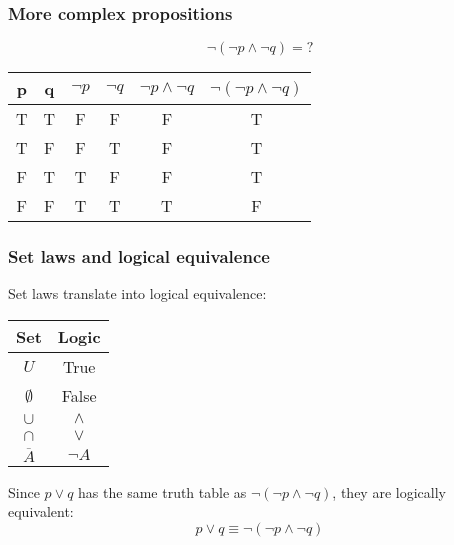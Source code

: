 \documentclass{article}
\begin{document}
\subsubsection{More complex propositions}
\[
    \lnot (\lnot p \land \lnot q) = ?
\]
\begin{table}[h!]
    \begin{center}
        \begin{tabular}{c|c|c|c|c|c}
            p & q & $\lnot p$ & $\lnot q$ & $\lnot p \land \lnot q$ & $\lnot (\lnot p \land \lnot q)$ \\
            \hline
            T & T & F         & F         & F                       & T                               \\
            T & F & F         & T         & F                       & T                               \\
            F & T & T         & F         & F                       & T                               \\
            F & F & T         & T         & T                       & F
        \end{tabular}
    \end{center}
\end{table}

\subsubsection{Set laws and logical equivalence}
Set laws translate into logical equivalence:
\begin{table}[h!]
    \begin{center}
        \begin{tabular}{c|c}
            Set            & Logic     \\
            \hline
            $U$            & True      \\
            $\emptyset $   & False     \\
            $\cup$         & $\land$   \\
            $\cap$         & $\lor$    \\
            $\overline{A}$ & $\lnot A$ \\
        \end{tabular}
    \end{center}
\end{table}

Since $p \lor q$ has the same truth table as $\lnot (\lnot p \land \lnot q)$, they are logically equivalent:
\[
    p \lor q \equiv \lnot (\lnot p \land \lnot q)
\]
\end{document}
